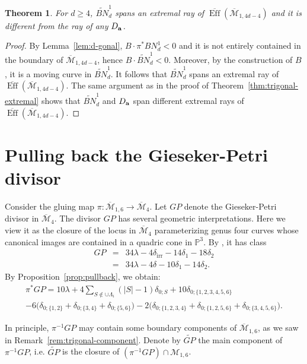 \documentclass[11]{amsart}
\theoremstyle{plain}
\newtheorem{theorem}{Theorem}[section]
\theoremstyle{definition}
\newcommand{\MM}{\mathcal M}
\newcommand{\BM}{\overline{\mathcal M}}
\newcommand{\BEff}{\overline{\operatorname{Eff}}}
\newcommand{\wt}{\widetilde}
\newcommand{\irr}{\operatorname{irr}}
\newcommand{\bbP}{\mathbb P}
\begin{document}
\begin{theorem}
\label{thm:d-gonal}
For $d\geq 4$, $\wt{BN}^1_d$ spans an extremal ray of $\BEff(\BM_{1,4d-4})$ and it is different from the ray of any $D_{\bf a}$. 
\end{theorem}

\begin{proof}
By Lemma~\ref{lem:d-gonal}, $B\cdot \pi^{*}BN^1_d < 0$ and it is not entirely contained in the boundary of $\BM_{1,4d-4}$, hence $B\cdot \wt{BN}^1_d < 0$. Moreover, by the construction of $B$, it is a moving curve in $\wt{BN}^1_d$. It follows that $\wt{BN}^1_d$ spans an extremal ray of $\BEff(\BM_{1,4d-4})$. 
The same argument 
as in the proof of Theorem~\ref{thm:trigonal-extremal} shows that $\wt{BN}^1_d$ and $D_{\bf a}$ span different extremal rays of $\BEff(\BM_{1,4d-4})$. 
\end{proof}

\section{Pulling back the Gieseker-Petri divisor}
\label{sec:GP}


Consider the gluing map $\pi: \BM_{1,6}\to \BM_4$. Let $GP$ denote the Gieseker-Petri divisor in $\BM_{4}$. The divisor $GP$ has several geometric interpretations. Here we view it as the closure of the locus in $\BM_4$
 parameterizing genus four curves whose canonical images are contained in a quadric cone in $\bbP^3$. By \cite[Theorem 2]{EisenbudHarrisKodaira}, it has class  
\begin{eqnarray*}
GP & = & 34\lambda - 4\delta_{\irr} - 14\delta_{1} - 18 \delta_2 \\
      & = & 34\lambda - 4\delta - 10\delta_1 - 14\delta_2. 
\end{eqnarray*}
By Proposition~\ref{prop:pullback}, we obtain: 
\begin{eqnarray}
\label{eqn:gp}
 \pi^{*}GP = 10\lambda + 4\sum_{S\not\in \cup \Lambda_i} (|S| - 1)\delta_{0;S} + 10 \delta_{0;\{1,2,3,4,5,6\}} \\
- 6 \big(\delta_{0;\{1,2\}} +  \delta_{0;\{3,4\}} +  \delta_{0;\{5,6\}}\big) - 2 \big(\delta_{0;\{1,2,3,4\}} + \delta_{0;\{1,2,5,6\}}  + \delta_{0;\{3,4,5,6\}}\big)\nonumber. 
\end{eqnarray}

In principle, $\pi^{-1}GP$ may contain some boundary components of $\BM_{1,6}$, as we saw in Remark~\ref{rem:trigonal-component}. Denote by $\wt{GP}$ the main component of $\pi^{-1}GP$, i.e. 
$\wt{GP}$ is the closure of $(\pi^{-1}GP)\cap \MM_{1,6}$. 
\end{document}
